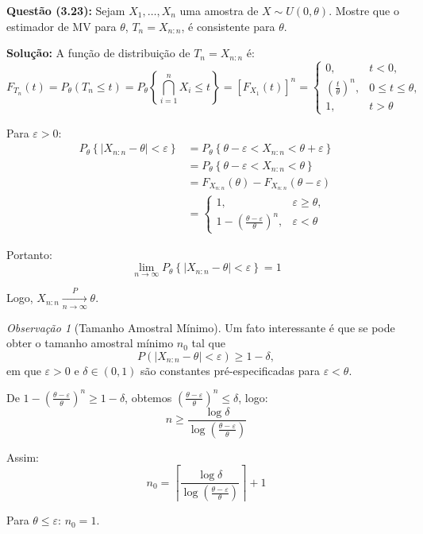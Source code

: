 \documentclass[12pt,a4paper]{article}
\theoremstyle{plain}
\theoremstyle{definition}
\theoremstyle{remark}
\newtheorem{observacao}[teorema]{Observação}
\begin{document}
\textbf{Questão (3.23):} Sejam $X_1, \ldots, X_n$ uma amostra de $X \sim U(0, \theta)$. Mostre que o estimador de MV para $\theta$, $T_n = X_{n:n}$, é consistente para $\theta$.

\textbf{Solução:} A função de distribuição de $T_n = X_{n:n}$ é:
\[
F_{T_n}(t) = P_\theta(T_n \leq t) = P_\theta \left\{ \bigcap_{i=1}^n X_i \leq t \right\} = \left[ F_{X_1}(t) \right]^n = 
\begin{cases}
0, & t < 0, \\
\left( \frac{t}{\theta} \right)^n, & 0 \leq t \leq \theta, \\
1, & t > \theta
\end{cases}
\]

Para $\varepsilon > 0$:
\begin{align}
P_\theta \left\{ |X_{n:n} - \theta| < \varepsilon \right\} &= P_\theta \left\{ \theta - \varepsilon < X_{n:n} < \theta + \varepsilon \right\} \\
&= P_\theta \left\{ \theta - \varepsilon < X_{n:n} < \theta \right\} \\
&= F_{X_{n:n}}(\theta) - F_{X_{n:n}}(\theta - \varepsilon) \\
&= 
\begin{cases}
1, & \varepsilon \geq \theta, \\
1 - \left( \frac{\theta - \varepsilon}{\theta} \right)^n, & \varepsilon < \theta
\end{cases}
\end{align}

Portanto:
\[
\lim_{n \to \infty} P_\theta \left\{ |X_{n:n} - \theta| < \varepsilon \right\} = 1
\]

Logo, $X_{n:n} \xrightarrow[n \to \infty]{P} \theta$.

\begin{observacao}[Tamanho Amostral Mínimo]
Um fato interessante é que se pode obter o tamanho amostral mínimo $n_0$ tal que
\[
P\left( \left| X_{n:n} - \theta \right| < \varepsilon \right) \geq 1 - \delta,
\]
em que $\varepsilon > 0$ e $\delta \in (0,1)$ são constantes pré-especificadas para $\varepsilon < \theta$.

De $1 - \left( \frac{\theta - \varepsilon}{\theta} \right)^n \geq 1 - \delta$, obtemos $\left( \frac{\theta - \varepsilon}{\theta} \right)^n \leq \delta$, logo:
\[
n \geq \frac{\log \delta}{\log \left( \frac{\theta - \varepsilon}{\theta} \right)}
\]

Assim:
\[
n_0 = \left\lceil \frac{\log \delta}{\log \left( \frac{\theta - \varepsilon}{\theta} \right)} \right\rceil + 1
\]

Para $\theta \leq \varepsilon$: $n_0 = 1$.
\end{observacao}
\end{document}
